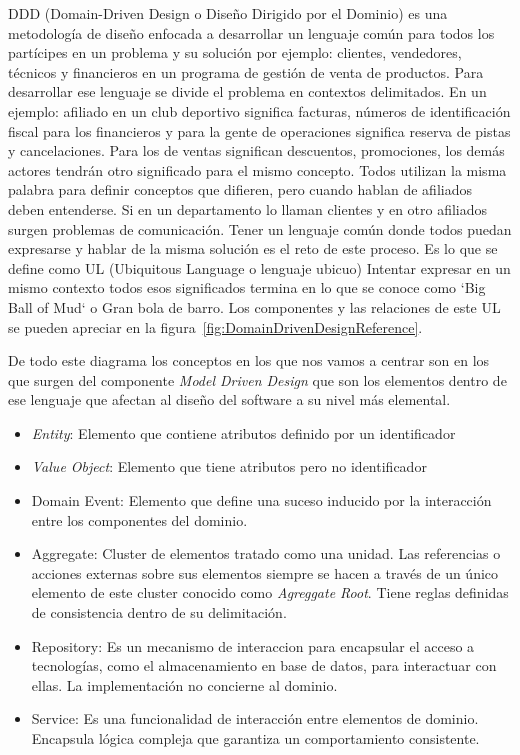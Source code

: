 \gls{DDD} (Domain-Driven Design o Diseño Dirigido por el Dominio) es una metodología de diseño enfocada a desarrollar un lenguaje común para todos los partícipes en un problema y su solución por ejemplo: clientes, vendedores, técnicos y financieros en un programa de gestión de venta de productos.
Para desarrollar ese lenguaje se divide el problema en contextos delimitados.
En un ejemplo: afiliado en un club deportivo significa facturas, números de identificación fiscal para los financieros y para la gente de operaciones significa reserva de pistas y cancelaciones.
Para los de ventas significan descuentos, promociones, los demás actores tendrán otro significado para el mismo concepto.
Todos utilizan la misma palabra para definir conceptos que difieren, pero cuando hablan de afiliados deben entenderse.
Si en un departamento lo llaman clientes y en otro afiliados surgen problemas de comunicación.
Tener un lenguaje común donde todos puedan expresarse y hablar de la misma solución es el reto de este proceso.
Es lo que se define como \gls{UL} (Ubiquitous Language o lenguaje ubicuo) Intentar expresar en un mismo contexto todos esos significados termina en lo que se conoce como `Big Ball of Mud` o Gran bola de barro.
Los componentes y las relaciones de este UL se pueden apreciar en la figura~\cref{fig:DomainDrivenDesignReference}.

De todo este diagrama los conceptos en los que nos vamos a centrar son en los que surgen del componente \textit{Model Driven Design} que son los elementos dentro de ese lenguaje que afectan al diseño del software a su nivel más elemental.

\begin{itemize}
    \item \textit{Entity}: Elemento que contiene atributos definido por un identificador
    \item \textit{Value Object}: Elemento que tiene atributos pero no identificador
    \item Domain Event: Elemento que define una suceso inducido por la interacción entre los componentes del dominio.
    \item Aggregate: Cluster de elementos tratado como una unidad.
    Las referencias o acciones externas sobre sus elementos siempre se hacen a través de un único elemento de este cluster conocido como \textit{Agreggate Root}.
    Tiene reglas definidas de consistencia dentro de su delimitación.
    \item Repository: Es un mecanismo de interaccion para encapsular el acceso a tecnologías, como el almacenamiento en base de datos, para interactuar con ellas.
    La implementación no concierne al dominio.
    \item Service: Es una funcionalidad de interacción entre elementos de dominio.
    Encapsula lógica compleja que garantiza un comportamiento consistente.
\end{itemize}


